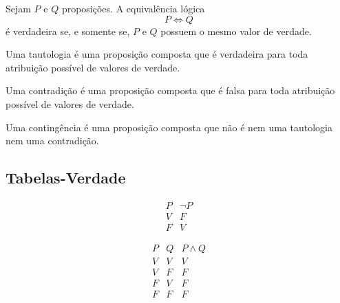 \documentclass[../../main]{subfiles}
\begin{document}
\begin{defn}
	\label{def:matematica:logica-matematica:logica-proposicional:equivalencia-logica}

	Sejam \(P\) e \(Q\) proposições. A equivalência lógica
	\begin{equation*}
		P \Leftrightarrow Q
	\end{equation*}
	é verdadeira se, e somente se, \(P\) e \(Q\) possuem o mesmo valor de verdade.
\end{defn}

\begin{defn}[Tautologia]
	\label{def:matematica:logica-matematica:logica-proposicional:tautologia}

	Uma tautologia é uma proposição composta que é verdadeira para toda
	atribuição possível de valores de verdade.
\end{defn}

\begin{defn}[Contradição]
	\label{def:matematica:logica-matematica:logica-proposicional:contradicao}

	Uma contradição é uma proposição composta que é falsa para toda
	atribuição possível de valores de verdade.
\end{defn}

\begin{defn}[Contingência]
	\label{def:matematica:logica-matematica:logica-proposicional:contingencia}

	Uma contingência é uma proposição composta que não é nem uma tautologia
	nem uma contradição.
\end{defn}

\newpage

\subsection{Tabelas-Verdade}

\begin{prop}
	\begin{equation*}
		\begin{array}{c|c}
			P & \neg P \\
			\hline
			V & F      \\
			F & V
		\end{array}
	\end{equation*}
\end{prop}

\begin{prop}
	\begin{equation*}
		\begin{array}{c|c|c}
			P & Q & P \land Q \\
			\hline
			V & V & V         \\
			V & F & F         \\
			F & V & F         \\
			F & F & F
		\end{array}
	\end{equation*}
\end{prop}
\end{document}
